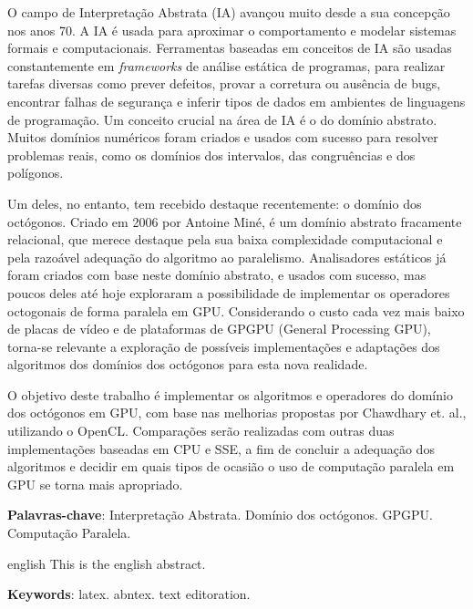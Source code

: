 

\setlength{\absparsep}{18pt} %
\begin{resumo}

O campo de Interpretação Abstrata (IA) avançou muito desde a sua concepção nos 
anos 70. A IA é usada para aproximar o comportamento e modelar sistemas formais 
e computacionais. Ferramentas baseadas em conceitos de IA são usadas 
constantemente em \emph{frameworks} de análise estática de programas, para 
realizar tarefas diversas como prever defeitos, provar a corretura ou ausência 
de bugs, encontrar falhas de segurança e inferir tipos de dados em ambientes de 
linguagens de programação. Um conceito crucial na área de IA é o do domínio 
abstrato. Muitos domínios numéricos foram criados e usados com sucesso para 
resolver problemas reais, como os domínios dos intervalos, das congruências e 
dos polígonos.

Um deles, no entanto, tem recebido destaque recentemente: o domínio dos 
octógonos. Criado em 2006 por Antoine Miné, é um domínio abstrato fracamente 
relacional, que merece destaque pela sua baixa complexidade computacional e 
pela razoável adequação do algoritmo ao paralelismo. Analisadores estáticos já 
foram criados com base neste domínio abstrato, e usados com sucesso, mas poucos 
deles até hoje exploraram a possibilidade de implementar os operadores 
octogonais de forma paralela em GPU. Considerando o custo cada vez mais baixo 
de placas de vídeo e de plataformas de GPGPU (General Processing GPU), torna-se 
relevante a exploração de possíveis implementações e adaptações dos algoritmos 
dos domínios dos octógonos para esta nova realidade.

O objetivo deste trabalho é implementar os algoritmos e operadores do domínio 
dos octógonos em GPU, com base nas melhorias propostas por Chawdhary et. al., 
utilizando o OpenCL. Comparações serão realizadas com outras duas 
implementações baseadas em CPU e SSE, a fim de concluir a adequação dos 
algoritmos e decidir em quais tipos de ocasião o uso de computação paralela em 
GPU se torna mais apropriado.

\vspace{\onelineskip}

\textbf{Palavras-chave}: Interpretação Abstrata. Domínio dos octógonos. GPGPU. Computação Paralela.
\end{resumo}

\begin{resumo}[Abstract]
 \begin{otherlanguage*}{english}
   This is the english abstract.

   \vspace{\onelineskip}
 
   \noindent 
   \textbf{Keywords}: latex. abntex. text editoration.
 \end{otherlanguage*}
\end{resumo}

